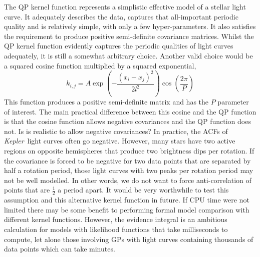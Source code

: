 \documentclass[useAMS, usenatbib, preprint, 12pt]{aastex}
\newcommand{\Kepler}{{\it Kepler}}
\begin{document}
The QP kernel function represents a simplistic effective model of a stellar
light curve.
It adequately describes the data, captures that all-important periodic quality
and is relatively simple, with only a few hyper-parameters.
It also satisfies the requirement to produce positive semi-definite covariance
matrices.
Whilst the QP kernel function evidently captures the periodic qualities of
light curves adequately, it is still a somewhat arbitrary choice.
Another valid choice would be a squared cosine function multiplied by a
squared exponential,
\begin{equation}
k_{i,j} = A \exp \left(-\frac{(x_i - x_j)^2}{2l^2}\right)
\cos\left(\frac{2\pi}{P}\right)
\end{equation}
\label{eq:cos_kernel}
This function produces a positive semi-definite matrix and has the $P$
parameter of interest.
The main practical difference between this cosine and the QP function is that
the cosine function allows negative covariances and the QP function does not.
Is is realistic to allow negative covariances?
In practice, the ACFs of \Kepler\ light curves often go negative.
However, many stars have two active regions on opposite hemispheres that
produce two brightness dips per rotation.
If the covariance is forced to be negative for two data points that are
separated by half a rotation period, those light curves with two peaks per
rotation period may not be well modelled.
In other words, we do not want to force anti-correlation of points that are
$\frac{1}{2}$ a period apart.
It would be very worthwhile to test this assumption and this alternative
kernel function in future.
If CPU time were not limited there may be some benefit to performing formal
model comparison with different kernel functions.
However, the evidence integral is an ambitious calculation for models with
likelihood functions that take milliseconds to compute, let alone those
involving GPs with light curves containing thousands of data points which can
take minutes.
\end{document}
